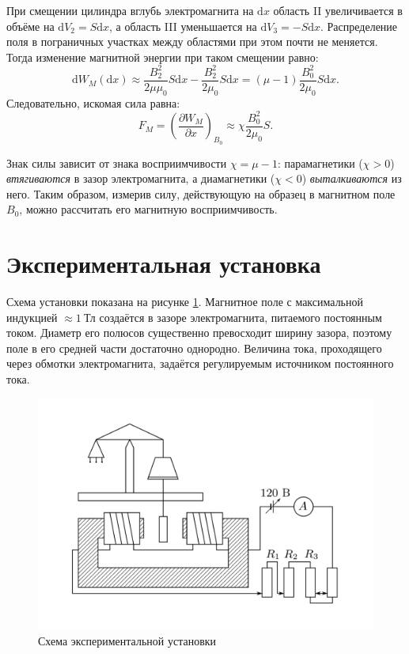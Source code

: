 \documentclass[a4paper, 12pt]{article}
\begin{document}
        При смещении цилиндра вглубь электромагнита на $\text{d}x$ область II увеличивается в объёме на $\text{d}V_2=S\text{d}x$, а область III уменьшается на $\text{d}V_3=-S\text{d}x$. Распределение поля в пограничных участках между областями при этом почти не меняется. Тогда изменение магнитной энергии при таком смещении равно:\[\text{d}W_M(\text{d}x)\approx\frac{B_2^2}{2\mu\mu_0}S\text{d}x-\frac{B_2^2}{2\mu_0}S\text{d}x=\left(\mu-1\right)\frac{B_0^2}{2\mu_0}S\text{d}x.\]Следовательно, искомая сила равна:\[F_M=\left(\frac{\partial W_M}{\partial x}\right)_{B_0}\approx\chi\frac{B_0^2}{2\mu_0}S.\]

        Знак силы зависит от знака восприимчивости $\chi=\mu-1$: парамагнетики ($\chi > 0$) \textit{втягиваются} в зазор электромагнита, а диамагнетики ($\chi < 0$) \textit{выталкиваются} из него. Таким образом, измерив силу, действующую на образец в магнитном поле $B_0$, можно рассчитать его магнитную восприимчивость.

    \section{Экспериментальная установка}

        Схема установки показана на рисунке \ref{img:device}. Магнитное поле с максимальной индукцией $\approx1~\text{Тл}$ создаётся в зазоре электромагнита, питаемого постоянным током. Диаметр его полюсов существенно превосходит ширину зазора, поэтому поле в его средней части достаточно однородно. Величина тока, проходящего через обмотки электромагнита, задаётся регулируемым источником постоянного тока.

        \begin{figure}[h]
            \centering
            \includegraphics[scale=0.35]{img/device.png}
            \caption{Схема экспериментальной установки} \label{img:device}
        \end{figure}
\end{document}
